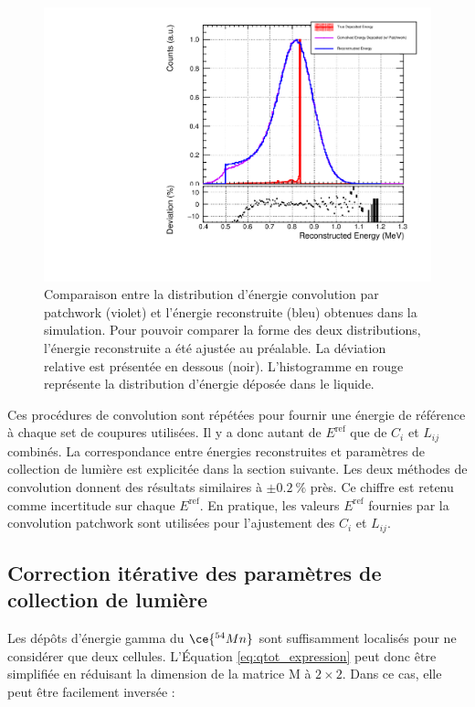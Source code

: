 {\begin{figure}[h!]
  \centering
  \includegraphics[width=0.7\linewidth]{images/E_conv_vs_E_rec_patchwork.pdf}
  \caption[Comparaison entre la distribution d'énergie convolution par patchwork et l'énergie reconstruite]{Comparaison entre la distribution d'énergie convolution par patchwork (violet) et l'énergie reconstruite (bleu) obtenues dans la simulation. Pour pouvoir comparer la forme des deux distributions, l'énergie reconstruite a été ajustée au préalable. La déviation relative est présentée en dessous (noir). L'histogramme en rouge représente la distribution d'énergie déposée dans le liquide.}
  \label{fig:E_patch_vs_E_rec}
\end{figure}

\clearpage
}

Ces procédures de convolution sont répétées pour fournir une énergie de référence à chaque set de coupures utilisées. Il y a donc autant de $E^\textrm{ref}$ que de $C_i$ et $L_{ij}$ combinés. La correspondance entre énergies reconstruites et paramètres de collection de lumière est explicitée dans la section suivante. Les deux méthodes de convolution donnent des résultats similaires à $\pm \SI{0.2}{\%}$ près. Ce chiffre est retenu comme incertitude sur chaque $E^{\textrm{ref}}$. En pratique, les valeurs $E^{\textrm{ref}}$ fournies par la convolution patchwork sont utilisées pour l'ajustement des $C_i$ et $L_{ij}$.\\

\subsection{Correction itérative des paramètres de collection de lumière}
\label{seq:Erec_tuning}

Les dépôts d'énergie gamma du $\ce{^{54}Mn}$ sont suffisamment localisés pour ne considérer que deux cellules. L'\'Equation \ref{eq:qtot_expression} peut donc être simplifiée en réduisant la dimension de la matrice M à $2\times 2$. Dans ce cas, elle peut être facilement inversée :

